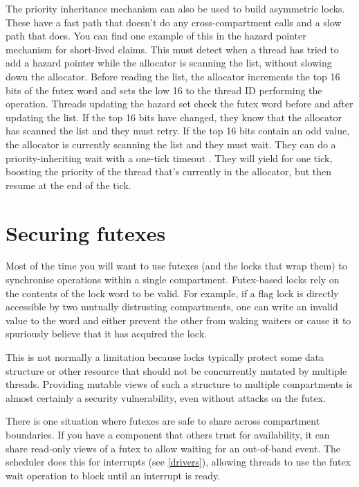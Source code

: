 The priority inheritance mechanism can also be used to build asymmetric locks.
These have a fast path that doesn't do any cross-compartment calls and a slow path that does.
You can find one example of this in the hazard pointer mechanism for short-lived claims.
This must detect when a thread has tried to add a hazard pointer while the allocator is scanning the list, without slowing down the allocator.
Before reading the list, the allocator increments the top 16 bits of the futex word and sets the low 16 to the thread ID performing the operation.
Threads updating the hazard set check the futex word before and after updating the list.
If the top 16 bits have changed, they know that the allocator has scanned the list and they must retry.
If the top 16 bits contain an odd value, the allocator is currently scanning the list and they must wait.
They can do a priority-inheriting wait with a one-tick timeout .
They will yield for one tick, boosting the priority of the thread that's currently in the allocator, but then resume at the end of the tick.


\section{Securing futexes}

Most of the time you will want to use futexes (and the locks that wrap them) to synchronise operations within a single compartment.
Futex-based locks rely on the contents of the lock word to be valid.
For example, if a flag lock is directly accessible by two mutually distrusting compartments, one can write an invalid value to the word and either prevent the other from waking waiters or cause it to spuriously believe that it has acquired the lock.

This is not normally a limitation because locks typically protect some data structure or other resource that should not be concurrently mutated by multiple threads.
Providing mutable views of such a structure to multiple compartments is almost certainly a security vulnerability, even without attacks on the futex.

There is one situation where futexes are safe to share across compartment boundaries.
If you have a component that others trust for availability, it can share read-only views of a futex to allow waiting for an out-of-band event.
The scheduler does this for interrupts (see \ref{drivers}), allowing threads to use the futex wait operation to block until an interrupt is ready.

